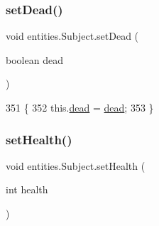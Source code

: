 \subsubsection{\texorpdfstring{set\+Dead()}{setDead()}}
{\footnotesize\ttfamily void entities.\+Subject.\+set\+Dead (\begin{DoxyParamCaption}\item[{boolean}]{dead }\end{DoxyParamCaption})\hspace{0.3cm}{\ttfamily [inline]}}


\begin{DoxyCode}
351                                       \{
352         this.\mbox{\hyperlink{classentities_1_1_subject_aab6a2f2446349b10689270b86e7931a4}{dead}} = \mbox{\hyperlink{classentities_1_1_subject_aab6a2f2446349b10689270b86e7931a4}{dead}};
353     \}
\end{DoxyCode}
\mbox{\label{classentities_1_1_subject_ac5ff99e7167f6b979e9d63cedbc8c9ba}} 
\subsubsection{\texorpdfstring{set\+Health()}{setHealth()}}
{\footnotesize\ttfamily void entities.\+Subject.\+set\+Health (\begin{DoxyParamCaption}\item[{int}]{health }\end{DoxyParamCaption})\hspace{0.3cm}{\ttfamily [inline]}}


